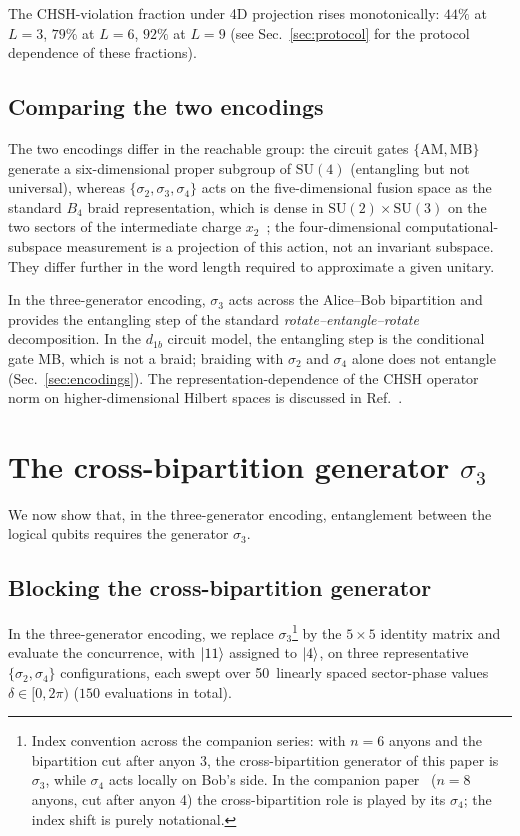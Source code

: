 \documentclass[aps,pra,twocolumn,superscriptaddress,longbibliography,floatfix,nofootinbib]{revtex4-2}
\begin{document}
The CHSH-violation fraction under 4D projection rises monotonically:
$44\%$ at $L=3$, $79\%$ at $L=6$, $92\%$ at $L=9$
(see Sec.~\ref{sec:protocol} for the protocol dependence of these
fractions).

\subsection{Comparing the two encodings}

The two encodings differ in the reachable group:
the circuit gates $\{\mathrm{AM},\mathrm{MB}\}$ generate a
six-dimensional proper subgroup of
$\mathrm{SU}(4)$ (entangling but not universal), whereas
$\{\sigma_2,\sigma_3,\sigma_4\}$ acts on the five-dimensional fusion space as
the standard $B_4$ braid representation, which is dense in
$\mathrm{SU}(2)\times\mathrm{SU}(3)$ on the two sectors of the intermediate
charge $x_2$~\cite{Bonesteel2005}; the four-dimensional computational-subspace
measurement is a projection of this action, not an invariant subspace. They
differ further in the word length required to approximate a given unitary.

In the three-generator encoding, $\sigma_3$ acts across the Alice--Bob
bipartition and provides the entangling step of the standard
\emph{rotate--entangle--rotate} decomposition. In the $d_{1b}$ circuit
model, the entangling step is the conditional gate MB, which is not a
braid; braiding with $\sigma_2$ and $\sigma_4$ alone does not entangle
(Sec.~\ref{sec:encodings}). The representation-dependence of the CHSH
operator norm on higher-dimensional Hilbert spaces is discussed in
Ref.~\cite{Sorella2023}.

\section{The cross-bipartition generator $\sigma_3$}
\label{sec:switch}

We now show that, in the three-generator encoding, entanglement between
the logical qubits requires the generator $\sigma_3$.

\subsection{Blocking the cross-bipartition generator}

In the three-generator encoding, we replace $\sigma_3$\footnote{Index convention across the companion series: with $n=6$ anyons and the bipartition cut after anyon 3, the cross-bipartition generator of this paper is $\sigma_3$, while $\sigma_4$ acts locally on Bob's side. In the companion paper~\cite{Sayim2026chsh} ($n=8$ anyons, cut after anyon 4) the cross-bipartition role is played by its $\sigma_4$; the index shift is purely notational.} by the
$5\times 5$ identity matrix and evaluate the concurrence, with
$\ket{11}$ assigned to $\ket{4}$, on three representative
$\{\sigma_2,\sigma_4\}$ configurations, each swept over 50~linearly
spaced sector-phase values $\delta\in[0,2\pi)$
($150$ evaluations in total).
\end{document}
